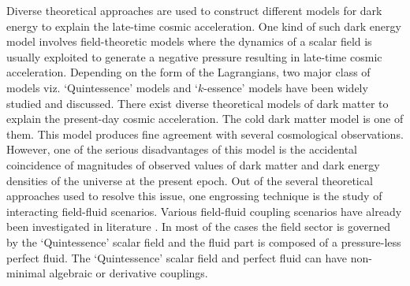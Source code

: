 \documentclass[a4paper,12pt]{article}
\begin{document}
Diverse theoretical approaches are used to construct different models for dark energy\cite{DES:2021wwk} to explain the late-time cosmic acceleration. One kind of such dark energy model involves field-theoretic models where the dynamics of a scalar field is usually exploited to generate a negative pressure resulting in late-time cosmic acceleration. Depending on the form of the Lagrangians, two major class of models viz. `Quintessence' models \cite{Peccei:1987mm,Ford:1987de,Peebles:2002gy,Nishioka:1992sg, Ferreira:1997au,Ferreira:1997hj,Caldwell:1997ii,Carroll:1998zi,Copeland:1997et,Zlatev:1998tr,Hebecker:2000au,Hebecker:2000zb} and `$k$-essence' models \cite{Fang:2014qga,ArmendarizPicon:1999rj,ArmendarizPicon:2000ah,ArmendarizPicon:2000dh,ArmendarizPicon:2005nz,Chiba:1999ka,ArkaniHamed:2003uy,Caldwell:1999ew}  have been widely studied and discussed. There exist diverse theoretical models of dark matter to explain the present-day cosmic acceleration. The cold dark matter model is one of them.  This model produces fine agreement with several cosmological observations. However, one of the serious disadvantages of this model is the accidental coincidence of magnitudes of observed values of dark matter and dark energy densities of the universe at the present epoch. Out of the several theoretical approaches used to resolve this issue, one engrossing technique is the study of interacting field-fluid scenarios. Various field-fluid coupling scenarios have already been investigated in literature \cite{Brown:1992kc,Boehmer:2015kta,Boehmer:2015sha,Shahalam:2017fqt,Barros:2019rdv,Kerachian:2019tar}. In most of the cases the field sector is governed by the `Quintessence' scalar field and the fluid part is composed of a pressure-less perfect fluid. The `Quintessence' scalar field and perfect fluid can have non-minimal  algebraic \cite{Boehmer:2015kta} or derivative \cite{Boehmer:2015sha} couplings. 
\end{document}
